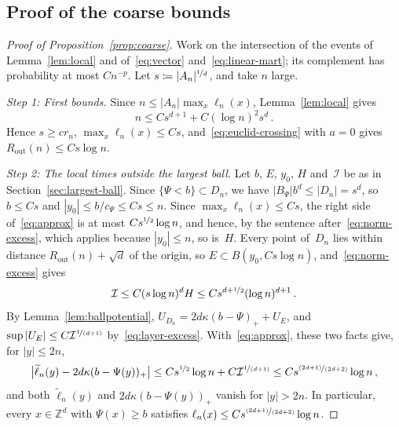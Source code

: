 \documentclass[11pt]{amsart}
\theoremstyle{plain}
\theoremstyle{definition}
\newcommand{\Z}{\mathbb Z}
\newcommand{\drift}{\kappa}
\newcommand{\gauge}{\Psi}
\newcommand{\nf}{\nicefrac}
\newcommand{\Rout}{R_{\mathrm{out}}}
\numberwithin{equation}{section}
\begin{document}
\subsection{Proof of the coarse bounds}

\begin{proof}[Proof of Proposition~\ref{prop:coarse}]
Work on the intersection of the events of Lemma~\ref{lem:local} and of~\eqref{eq:vector} and~\eqref{eq:linear-mart}; its complement has probability at most $Cn^{-p}$. Let $s\coloneqq|A_n|^{\nf1d}$, and take $n$ large.

\emph{Step 1: First bounds.} Since $n\leq|A_n|\max_x\ell_n(x)$, Lemma~\ref{lem:local} gives
\begin{equation*}
n\leq Cs^{d+1}+C(\log n)^2s^d\, .
\end{equation*}
Hence $s\geq cr_n$, $\max_x\ell_n(x)\leq Cs$, and~\eqref{eq:euclid-crossing} with $a=0$ gives $\Rout(n)\leq Cs\log n$.

\emph{Step 2: The local times outside the largest ball.} Let $b$, $E$, $y_0$, $H$ and~$\mathcal I$ be as in Section~\ref{sec:largest-ball}. Since $\{\gauge<b\}\subset D_n$, we have $|B_\gauge|b^d\leq|D_n|=s^d$, so $b\leq Cs$ and $|y_0|\leq b/c_\gauge\leq Cs\leq n$. Since $\max_x\ell_n(x)\leq Cs$, the right side of~\eqref{eq:approx} is at most $Cs^{\nf12}\log n$, and hence, by the sentence after~\eqref{eq:norm-excess}, which applies because $|y_0|\leq n$, so is~$H$. Every point of~$D_n$ lies within distance $\Rout(n)+\sqrt d$ of the origin, so $E\subset B(y_0,Cs\log n)$, and~\eqref{eq:norm-excess} gives
\begin{equation*}
\mathcal I\leq C(s\log n)^dH\leq Cs^{d+\nf12}(\log n)^{d+1}\, .
\end{equation*}
By Lemma~\ref{lem:ballpotential}, $U_{D_n}=2d\drift(b-\gauge)_++U_E$, and $\sup|U_E|\leq C\mathcal I^{\nf{1}{(d+1)}}$ by~\eqref{eq:layer-excess}. With~\eqref{eq:approx}, these two facts give, for $|y|\leq2n$,
\begin{equation}\label{eq:coarse-profile}
\bigl|\widetilde\ell_n(y)-2d\drift(b-\gauge(y))_+\bigr|\leq Cs^{\nf12}\log n+C\mathcal I^{\nf{1}{(d+1)}}\leq Cs^{\nf{(2d+1)}{(2d+2)}}\log n\, ,
\end{equation}
and both $\widetilde\ell_n(y)$ and $2d\drift(b-\gauge(y))_+$ vanish for $|y|>2n$. In particular, every $x\in\Z^d$ with $\gauge(x)\geq b$ satisfies $\ell_n(x)\leq Cs^{\nf{(2d+1)}{(2d+2)}}\log n$.


\end{proof}
\end{document}
